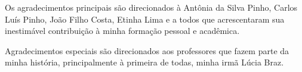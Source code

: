 \begin{agradecimentos}
	Os agradecimentos principais são direcionados à Antônia da Silva Pinho, Carlos Luís Pinho, João Filho Costa, Etinha Lima e a todos que acrescentaram sua inestimável contribuição à minha formação pessoal e acadêmica.

	Agradecimentos especiais são direcionados aos professores que fazem parte da minha história, principalmente à primeira de todas, minha irmã Lúcia Braz.
\end{agradecimentos}
